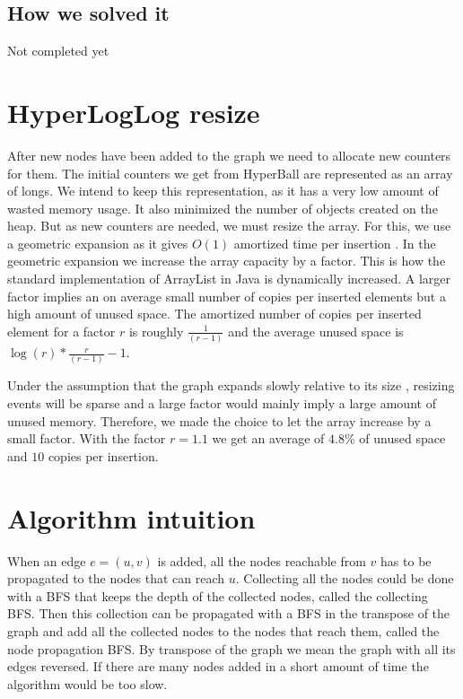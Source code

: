 \subsection{How we solved it}
Not completed yet

\section{HyperLogLog resize}
After new nodes have been added to the graph we need to allocate new counters for them. The initial counters we get from HyperBall are represented as an array of longs. We intend to keep this representation, as it has a very low amount of wasted memory usage. It also minimized the number of objects created on the heap. But as new counters are needed, we must resize the array. For this, we use a geometric expansion as it gives $O(1)$ amortized time per insertion \cite{dynamicarrays}. In the geometric expansion we increase the array capacity by a factor. This is how the standard implementation of ArrayList in Java is dynamically increased. A larger factor implies an on average small number of copies per inserted elements but a high amount of unused space. The amortized number of copies per inserted element for a factor $r$ is roughly $\frac{1}{(r-1)}$ and the average unused space is $\log(r)*\frac{r}{(r-1)} - 1$. \cite{dynamicarrays}

Under the assumption that the graph expands slowly relative to its size , resizing events will be sparse and a large factor would mainly imply a large amount of unused memory. Therefore, we made the choice to let the array increase by a small factor. With the factor $r = 1.1$ we get an average of $4.8$\% of unused space and $10$ copies per insertion. 

\section{Algorithm intuition}

When an edge $e=(u,v)$ is added, all the nodes reachable from $v$ has to be propagated to the nodes that can reach $u$. Collecting all the nodes could be done with a BFS that keeps the depth of the collected nodes, called the collecting BFS. Then this collection can be propagated with a BFS in the transpose of the graph and add all the collected nodes to the nodes that reach them, called the node propagation BFS. By transpose of the graph we mean the graph with all its edges reversed. If there are many nodes added in a short amount of time the algorithm would be too slow. 

